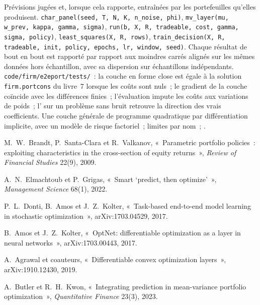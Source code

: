 \begin{build}
 Prévisions jugées et, lorsque cela rapporte, entraînées par les portefeuilles qu'elles produisent.
 \texttt{char\_panel(seed, T, N, K, n\_noise, phi)}, \texttt{mv\_layer(mu, w\_prev, kappa, gamma, sigma)},
\texttt{run(b, X, R, tradeable, cost, gamma, sigma, policy)}, \texttt{least\_squares(X, R, rows)},
\texttt{train\_decision(X, R, tradeable, init, policy, epochs, lr, window, seed)}.
 Chaque résultat de bout en bout est rapporté par rapport aux moindres carrés alignés sur les mêmes données hors échantillon, avec sa dispersion sur
échantillons indépendants.
 \texttt{code/firm/e2eport/tests/}~: la couche en forme close est égale à la solution \texttt{firm.portcons}
du livre~7 lorsque les coûts sont nuls~; le gradient de la couche coïncide avec les différences finies~; l'évaluation impute les coûts aux variations de poids~;
l' sur un problème sans bruit retrouve la direction des vrais coefficients.
 Une couche générale de programme quadratique par différentiation implicite, avec un modèle de risque factoriel~; limites par nom~;
.
\end{build}

\begin{omsources}
\item M.~W.~Brandt, P.~Santa-Clara et R.~Valkanov, «~Parametric portfolio policies~: exploiting characteristics in the
cross-section of equity returns~», \emph{Review of Financial Studies} 22(9), 2009.
\item A.~N.~Elmachtoub et P.~Grigas, «~Smart `predict, then optimize'~», \emph{Management Science} 68(1), 2022.
\item P.~L.~Donti, B.~Amos et J.~Z.~Kolter, «~Task-based end-to-end model learning in stochastic optimization~»,
arXiv:1703.04529, 2017.
\item B.~Amos et J.~Z.~Kolter, «~OptNet: differentiable optimization as a layer in neural networks~», arXiv:1703.00443, 2017.
\item A.~Agrawal et coauteurs, «~Differentiable convex optimization layers~», arXiv:1910.12430, 2019.
\item A.~Butler et R.~H.~Kwon, «~Integrating prediction in mean-variance portfolio optimization~», \emph{Quantitative Finance}
23(3), 2023.
\end{omsources}

